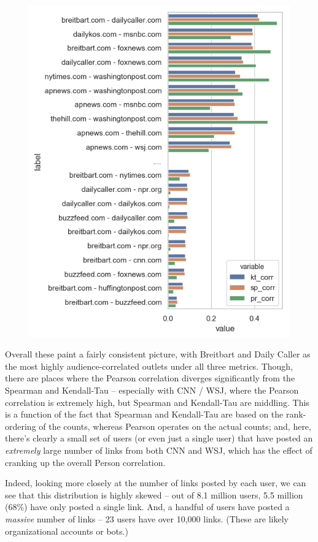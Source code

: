 \documentclass{scrartcl}
\begin{document}
\begin{figure}[H]
  \centering
  \includegraphics[height=0.4\textheight]{figures/user-graph-bars-all.png}
\end{figure}

Overall these paint a fairly consistent picture, with Breitbart and Daily Caller as the most highly audience-correlated outlets under all three metrics. Though, there are places where the Pearson correlation diverges significantly from the Spearman and Kendall-Tau -- especially with CNN / WSJ, where the Pearson correlation is extremely high, but Spearman and Kendall-Tau are middling. This is a function of the fact that Spearman and Kendall-Tau are based on the rank-ordering of the counts, whereas Pearson operates on the actual counts; and, here, there's clearly a small set of users (or even just a single user) that have posted an \textit{extremely} large number of links from both CNN and WSJ, which has the effect of cranking up the overall Person correlation.

Indeed, looking more closely at the number of links posted by each user, we can see that this distribution is highly skewed -- out of 8.1 million users, 5.5 million (68\%) have only posted a single link. And, a handful of users have posted a \textit{massive} number of links -- 23 users have over 10,000 links. (These are likely organizational accounts or bots.)
\end{document}
